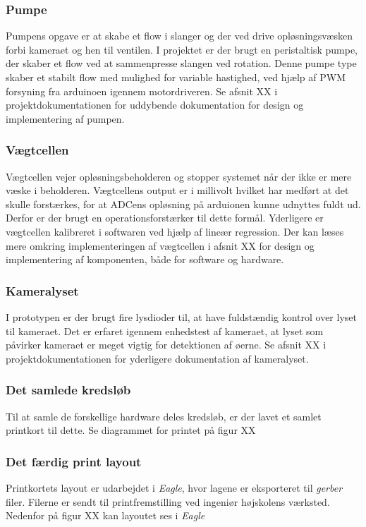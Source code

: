 \subsubsection{Pumpe}
Pumpens opgave er at skabe et flow i slanger og der ved drive opløsningsvæsken forbi kameraet og hen til ventilen. I projektet er der brugt en peristaltisk pumpe, der skaber et flow ved at sammenpresse slangen ved rotation. Denne pumpe type skaber et stabilt flow med mulighed for variable hastighed, ved hjælp af PWM forsyning fra arduinoen igennem motordriveren. Se afsnit XX i projektdokumentationen for uddybende dokumentation for design og implementering af pumpen.

\subsubsection{Vægtcellen}
Vægtcellen vejer opløsningsbeholderen og stopper systemet når der ikke er mere væske i beholderen. Vægtcellens output er i millivolt hvilket har medført at det skulle forstærkes, for at ADCens opløsning på arduionen kunne udnyttes fuldt ud. Derfor er der brugt en operationsforstærker til dette formål. Yderligere er vægtcellen kalibreret i softwaren ved hjælp af lineær regression. Der kan læses mere omkring implementeringen af vægtcellen i afsnit XX for design og implementering af komponenten, både for software og hardware.

\subsubsection{Kameralyset}
I prototypen er der brugt fire lysdioder til, at have fuldstændig kontrol over lyset til kameraet. Det er erfaret igennem enhedstest af kameraet, at lyset som påvirker kameraet er meget vigtig for detektionen af øerne. Se afsnit XX i projektdokumentationen for yderligere dokumentation af kameralyset.

 
\subsubsection{Det samlede kredsløb}
Til at samle de forskellige hardware deles kredsløb, er der lavet et samlet printkort til dette. Se diagrammet for printet på figur XX

\subsubsection{Det færdig print layout}
Printkortets layout er udarbejdet i \textit{Eagle}, hvor lagene er eksporteret til \textit{gerber} filer. Filerne er sendt til printfremstilling ved ingeniør højskolens værksted. Nedenfor på figur XX kan layoutet ses i \textit{Eagle}

